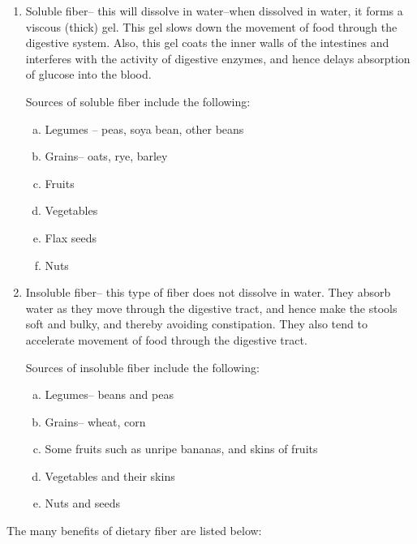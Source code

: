 \begin{enumerate}
\itemsep=0pt
\item Soluble fiber– this will dissolve in water–when dissolved in water, it forms a viscous (thick) gel. This gel slows down the movement of food through the digestive system. Also, this gel coats the inner walls of the intestines and interferes with the activity of digestive enzymes, and hence delays absorption of glucose into the blood.

Sources of soluble fiber include the following:
\begin{enumerate}[a)]
\itemsep=0pt
\item Legumes – peas, soya bean, other beans
\item Grains– oats, rye, barley
\item Fruits
\item Vegetables
\item Flax seeds
\item Nuts
\end{enumerate}
\item Insoluble fiber– this type of fiber does not dissolve in water. They absorb water as they move through the digestive tract, and hence make the stools soft and bulky, and thereby avoiding constipation. They also tend to accelerate movement of food through the digestive tract.

Sources of insoluble fiber include the following:
\begin{enumerate}[a)]
\itemsep=0pt
\item Legumes– beans and peas
\item Grains– wheat, corn
\item Some fruits such as unripe bananas, and skins of fruits
\item Vegetables and their skins
\item Nuts and seeds
\end{enumerate}
\end{enumerate}

\noindent The many benefits of dietary fiber are listed below:

